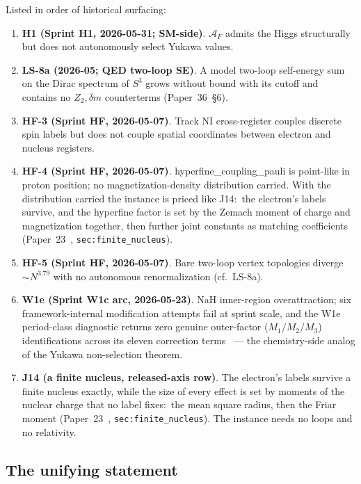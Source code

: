 \documentclass[11pt,a4paper]{article}
\theoremstyle{plain}
\theoremstyle{definition}
\newcommand{\AF}{\mathcal{A}_F}
\newcommand{\sphere}[1]{S^{#1}}
\begin{document}
Listed in order of historical surfacing:
\begin{enumerate}
  \item \textbf{H1 (Sprint H1, 2026-05-31; SM-side)}.  $\AF$ admits the Higgs structurally but does not autonomously select Yukawa values.
  \item \textbf{LS-8a (2026-05; QED two-loop SE)}.  A model two-loop self-energy sum on the Dirac spectrum of $\sphere{3}$ grows without bound with its cutoff and contains no $Z_2, \delta m$ counterterms (Paper~36~\S6).
  \item \textbf{HF-3 (Sprint HF, 2026-05-07)}.  Track NI cross-register couples discrete spin labels but does not couple spatial coordinates between electron and nucleus registers.
  \item \textbf{HF-4 (Sprint HF, 2026-05-07)}.  hyperfine\_coupling\_pauli is point-like in proton position; no magnetization-density distribution carried.  With the distribution carried the instance is priced like J14:\ the electron's labels survive, and the hyperfine factor is set by the Zemach moment of charge and magnetization together, then further joint constants as matching coefficients (Paper~23~\cite{paper23}, \texttt{sec:finite\_nucleus}).
  \item \textbf{HF-5 (Sprint HF, 2026-05-07)}.  Bare two-loop vertex topologies diverge $\sim N^{3.79}$ with no autonomous renormalization (cf.\ LS-8a).
  \item \textbf{W1e (Sprint W1c arc, 2026-05-23)}.  NaH inner-region overattraction; six framework-internal modification attempts fail at sprint scale, and the W1e period-class diagnostic returns zero genuine outer-factor ($M_1/M_2/M_3$) identifications across its eleven correction terms~\cite{debug_w1e} --- the chemistry-side analog of the Yukawa non-selection theorem.
  \item \textbf{J14 (a finite nucleus, released-axis row)}.  The electron's labels survive a finite nucleus exactly, while the size of every effect is set by moments of the nuclear charge that no label fixes:\ the mean square radius, then the Friar moment (Paper~23~\cite{paper23}, \texttt{sec:finite\_nucleus}). The instance needs no loops and no relativity.
\end{enumerate}

\subsection{The unifying statement}
\label{sec:unity_statement}
\end{document}
